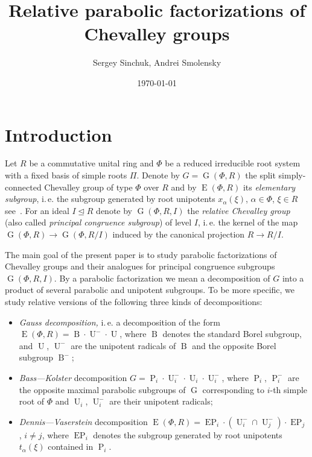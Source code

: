 \documentclass[12pt]{amsart}
\title{Relative parabolic factorizations of Chevalley groups}
\author {Sergey Sinchuk, Andrei Smolensky}
\date {\today}
\numberwithin{equation}{section}
\theoremstyle{definition}
\DeclareMathOperator{\G}{G}
\DeclareMathOperator{\E}{E}
\DeclareMathOperator{\EP}{EP}
\DeclareMathOperator{\Par}{P}
\DeclareMathOperator{\B}{B}
\DeclareMathOperator{\U}{U}
\begin{document}

\maketitle

\section{Introduction}\label{sec:intro}
Let $R$ be a commutative unital ring and $\Phi$ be a reduced irreducible root system with a fixed basis of simple roots $\Pi$.
Denote by $G=\G(\Phi, R)$ the split simply-connected Chevalley group of type $\Phi$ over $R$ and by $\E(\Phi, R)$ its \emph{elementary subgroup}, 
i.\,e. the subgroup generated by root unipotents $x_\alpha(\xi)$, $\alpha\in\Phi$, $\xi\in R$ see~\cite{VP, St78, S}.
For an ideal $I \trianglelefteq R$ denote by $\G(\Phi, R, I)$ the \emph{relative Chevalley group} (also called \emph{principal congruence subgroup}) of level $I$, 
i.\,e. the kernel of the map $\G(\Phi, R)\rightarrow\G(\Phi, R/I)$ induced by the canonical projection $R\rightarrow R/I$.

The main goal of the present paper is to study parabolic factorizations of Chevalley groups and their analogues for principal congruence subgroups $\G(\Phi, R, I)$.
By a parabolic factorization we mean a decomposition of $G$ into a product of several parabolic and unipotent subgroups.
To be more specific, we study relative versions of the following three kinds of decompositions:
\begin{itemize}
\item \emph{Gauss decomposition,} i.\,e. a decomposition of the form $\E(\Phi,R)=\B \cdot \U^- \cdot \U$, where $\B$ denotes the standard Borel subgroup,
      and $\U$, $\U^-$ are the unipotent radicals of $\B$ and the opposite Borel subgroup $\B^-$;
\item \emph{Bass---Kolster} decomposition $G = \Par_i \cdot \U_i^- \cdot \U_i \cdot \U_i^-$, where 
      $\Par_i$, $\Par_i^-$ are the opposite maximal parabolic subgroups of $\G$ corresponding to $i$-th simple root of $\Phi$ and $\U_i$, $\U_i^-$ are their unipotent radicals;
\item \emph{Dennis---Vaserstein} decomposition $\E(\Phi, R) = \EP_i \cdot (\U_i^- \cap \U_j^-) \cdot \EP_j$, $i\neq j$,
      where $\EP_i$ denotes the subgroup generated by root unipotents $t_\alpha(\xi)$ contained in $\Par_i$.
\end{itemize}
\end{document}
